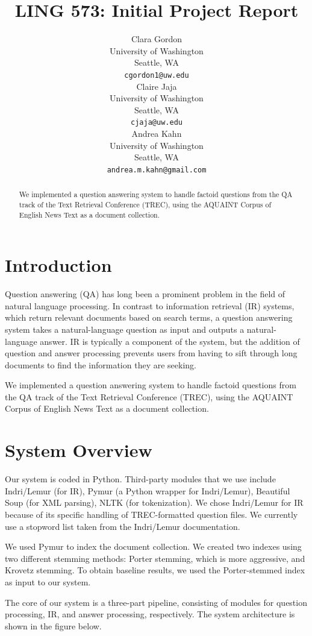 \documentclass[11pt]{article}
\title{LING 573: Initial Project Report}
\author{Clara Gordon \\
  University of Washington \\
  Seattle, WA \\
  {\tt cgordon1@uw.edu} \\\And
  Claire Jaja \\
  University of Washington \\
  Seattle, WA \\
  {\tt cjaja@uw.edu} \\\And
  Andrea Kahn \\
  University of Washington \\
  Seattle, WA \\
  {\tt andrea.m.kahn@gmail.com} \\}
\date{}
\begin{document}
\maketitle
\begin{abstract}

We implemented a question answering system to handle factoid questions from the QA track of the Text Retrieval Conference (TREC), using the AQUAINT Corpus of English News Text as a document collection.

\end{abstract}

\section{Introduction}

Question answering (QA) has long been a prominent problem in the field of natural language processing. In contrast to information retrieval (IR) systems, which return relevant documents based on search terms, a question answering system takes a natural-language question as input and outputs a natural-language answer. IR is typically a component of the system, but the addition of question and answer processing prevents users from having to sift through long documents to find the information they are seeking.

We implemented a question answering system to handle factoid questions from the QA track of the Text Retrieval Conference (TREC), using the AQUAINT Corpus of English News Text as a document collection.

\section{System Overview}

Our system is coded in Python. Third-party modules that we use include Indri/Lemur (for IR), Pymur (a Python wrapper for Indri/Lemur), Beautiful Soup (for XML parsing), NLTK (for tokenization). We chose Indri/Lemur for IR because of its specific handling of TREC-formatted question files. We currently use a stopword list taken from the Indri/Lemur documentation.

We used Pymur to index the document collection. We created two indexes using two different stemming methods: Porter stemming, which is more aggressive, and Krovetz stemming. To obtain baseline results, we used the Porter-stemmed index as input to our system.

The core of our system is a three-part pipeline, consisting of modules for question processing, IR, and answer processing, respectively. The system architecture is shown in the figure below.
\end{document}
